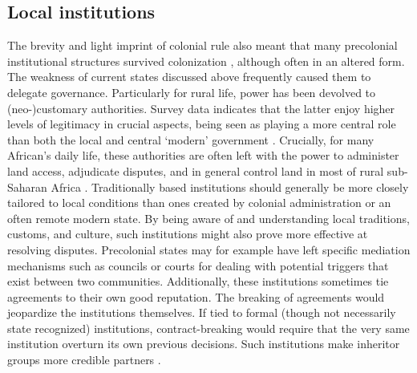 \subsection{Local institutions} \label{Local institutions}

The brevity and light imprint of colonial rule also meant that many precolonial
institutional structures survived colonization \citep{Wig2016, Wig2018},
although often in an altered form. The weakness of current states discussed
above frequently caused them to delegate governance. Particularly for rural
life, power has been devolved to (neo-)customary authorities. Survey data
indicates that the latter enjoy higher levels of legitimacy in crucial aspects,
being seen as playing a more central role than both the local and central
`modern' government \citep[360]{Logan_2013}. Crucially, for many African's daily
life, these authorities are often left with the power to administer land access,
adjudicate disputes, and in general control land in most of rural sub-Saharan
Africa \citep{englebert2013inside, boone2014property, posner2005institutions}.
Traditionally based institutions should generally be more closely tailored to
local conditions than ones created by colonial administration or an often remote
modern state. By being aware of and understanding local traditions, customs, and
culture, such institutions might also prove more effective at resolving
disputes. Precolonial states may for example have left specific mediation
mechanisms such as councils or courts for dealing with potential triggers that
exist between two communities. Additionally, these institutions sometimes tie
agreements to their own good reputation. The breaking of agreements would
jeopardize the institutions themselves. If tied to formal (though not
necessarily state recognized) institutions, contract-breaking would require that
the very same institution overturn its own previous decisions. Such institutions
make inheritor groups more credible partners \citep{Wig2018}. 


